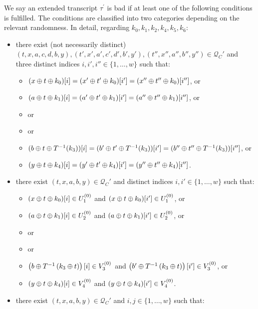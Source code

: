 \begin{definition}
	\label{defn:bad-tau-6-rounds}
	
	We say an extended transcript $\tau^{\prime}$ is bad if at least one of the following conditions is fulfilled. The conditions are classified into two categories depending on the relevant randomness. In detail, regarding $k_0,k_1,k_2,k_4,k_5,k_6$:
	\begin{itemize}[leftmargin=10mm]
		\item[\cone] there exist (not necessarily distinct) $(t,x,a,c,d,b,y),(t',x',a',c',d',b',y'),(t'',x'',a'',b'',y'')\in \mathcal{Q}_{C}'$ and three distinct indices $i, i', i'' \in \{1, \ldots, w\}$ such that:
		\begin{itemize}
			\item $(x\oplus t\oplus k_0)[i]=(x'\oplus t'\oplus k_0)[i']=(x''\oplus t''\oplus k_0)[i'']$, or
			\item $(a\oplus t\oplus k_1)[i]=(a'\oplus t'\oplus k_1)[i']=(a''\oplus t''\oplus k_1)[i'']$, or
			\item or
			\item or
			\item $(b\oplus t\oplus T^{-1}(k_3))[i]=(b'\oplus t'\oplus T^{-1}(k_3))[i']=(b''\oplus t''\oplus T^{-1}(k_3))[i'']$, or
			\item $(y\oplus t\oplus k_4)[i]=(y'\oplus t'\oplus k_4)[i']=(y''\oplus t''\oplus k_4)[i'']$.
		\end{itemize}
		\item[\ctwo] there exist $(t,x,a,b,y) \in \mathcal{Q}_{C}'$ and distinct indices $i, i' \in \{1, \ldots, w\}$ such that:
		\begin{itemize}
			\item $(x\oplus t\oplus k_0)[i]\in U_1^{(0)}$ and $(x\oplus t\oplus k_0)[i']\in U_1^{(0)}$, or
			\item $(a\oplus t \oplus k_1)[i]\in U_{2}^{(0)}$ and $(a\oplus t \oplus k_1)[i']\in U_{2}^{(0)}$, or
			\item or
			\item or
			\item $\left(b\oplus T^{-1}\left(k_3\oplus t\right)\right)[i]\in V_3^{(0)}$ and
			$\left(b'\oplus T^{-1}\left(k_3\oplus t\right)\right)[i']\in V_3^{(0)}$, or
			\item $(y\oplus t\oplus k_4)[i]\in V_4^{(0)}$ and $(y\oplus t\oplus k_4)[i']\in V_4^{(0)}$.
		\end{itemize}
		\item[\cthree] there exist $(t,x,a,b,y) \in \mathcal{Q}_{C}'$ and $i, j \in \{1, \ldots, w\}$ such that:
		\begin{itemize}

\end{itemize}
\end{itemize}
\end{definition}
